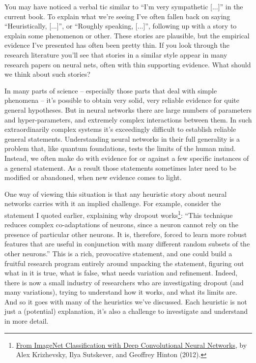 \documentclass[a4paper,twoside,10pt]{book}
\begin{document}
You may have noticed a verbal tic similar to ``I'm very sympathetic [...]'' in the current book. To explain what we're seeing I've often fallen back on saying ``Heuristically, [...]'', or ``Roughly speaking, [...]'', following up with a story to explain some phenomenon or other. These stories are plausible, but the empirical evidence I've presented has often been pretty thin. If you look through the research literature you'll see that stories in a similar style appear in many research papers on neural nets, often with thin supporting evidence. What should we think about such stories?

In many parts of science -- especially those parts that deal with simple phenomena -- it's possible to obtain very solid, very reliable evidence for quite general hypotheses. But in neural networks there are large numbers of parameters and hyper-parameters, and extremely complex interactions between them. In such extraordinarily complex systems it's exceedingly difficult to establish reliable general statements. Understanding neural networks in their full generality is a problem that, like quantum foundations, tests the limits of the human mind. Instead, we often make do with evidence for or against a few specific instances of a general statement. As a result those statements sometimes later need to be modified or abandoned, when new evidence comes to light.

One way of viewing this situation is that any heuristic story about neural networks carries with it an implied challenge. For example, consider the statement I quoted earlier, explaining why dropout works\footnote{\href{https://papers.nips.cc/paper/4824-imagenet-classification-with-deep-convolutional-neural-networks.pdf}{From ImageNet Classification with Deep Convolutional Neural Networks}, by Alex Krizhevsky, Ilya Sutskever, and Geoffrey Hinton (2012).}: ``This technique reduces complex co-adaptations of neurons, since a neuron cannot rely on the presence of particular other neurons. It is, therefore, forced to learn more robust features that are useful in conjunction with many different random subsets of the other neurons.'' This is a rich, provocative statement, and one could build a fruitful research program entirely around unpacking the statement, figuring out what in it is true, what is false, what needs variation and refinement. Indeed, there is now a small industry of researchers who are investigating dropout (and many variations), trying to understand how it works, and what its limits are. And so it goes with many of the heuristics we've discussed. Each heuristic is not just a (potential) explanation, it's also a challenge to investigate and understand in more detail.
\end{document}
